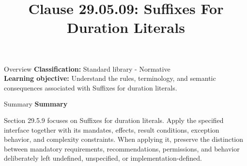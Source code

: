 \documentclass[10pt,letterpaper]{article}
\title{Clause 29.05.09: Suffixes For Duration Literals}
\author{}
\date{}
\begin{document}
\maketitle
\begin{CornellOverviewBox}{Overview}
\textbf{Classification:} Standard library - Normative\\[2pt]
\textbf{Learning objective:} Understand the rules, terminology, and semantic consequences associated with Suffixes for duration literals.
\end{CornellOverviewBox}\begin{CornellSummaryBox}{Summary}
{\sffamily\bfseries\color{Accent} Summary}\par\vspace{3pt}Section 29.5.9 focuses on Suffixes for duration literals. Apply the specified interface together with its mandates, effects, result conditions, exception behavior, and complexity constraints. When applying it, preserve the distinction between mandatory requirements, recommendations, permissions, and behavior deliberately left undefined, unspecified, or implementation-defined.
\end{CornellSummaryBox}
\end{document}
